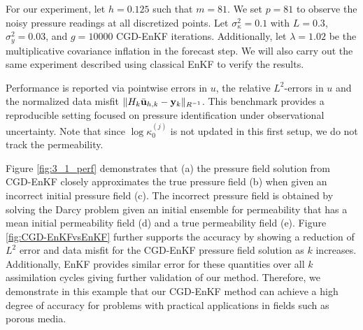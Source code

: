\documentclass[11p]{elsarticle}
\numberwithin{equation}{section}
\begin{document}
For our experiment, let $h=0.125$ such that $m=81$.  We set $p=81$ to observe the noisy pressure readings at all discretized points.  Let $\sigma_\kappa^2=0.1$ with $L=0.3$, $\sigma_y^2=0.03$, and $g=10000$ CGD-EnKF iterations.  Additionally, let $\lambda=1.02$ be the multiplicative covariance inflation in the forecast step.  We will also carry out the same experiment described using classical EnKF to verify the results.


Performance is reported via pointwise errors in \(u\), the relative \(L^2\)-errors in \(u\) and the normalized data misfit \(\|H_k\bar{\bf u}_{h,k}-{\bf y}_k\|_{R^{-1}}\).  This
benchmark provides a reproducible setting focused on pressure
identification under observational uncertainty.  Note that since $\log \kappa_0^{(j)}$ is not updated in this first setup, we do not track the permeability.

Figure \ref{fig:3_1_perf} demonstrates that (a) the pressure field solution from CGD-EnKF closely approximates the true pressure field (b) when given an incorrect initial pressure field (c).  The incorrect pressure field is obtained by solving the Darcy problem given an initial ensemble for permeability that has a mean initial permeability field (d) and a true permeability field (e). Figure \ref{fig:CGD-EnKFvsEnKF} further supports the accuracy by showing a reduction of $L^2$ error and data misfit for the CGD-EnKF pressure field solution as $k$ increases.  Additionally, EnKF provides similar error for these quantities over all $k$ assimilation cycles giving further validation of our method.  Therefore, we demonstrate in this example that our CGD-EnKF method can achieve a high degree of accuracy for problems with practical applications in fields such as porous media.
\end{document}
